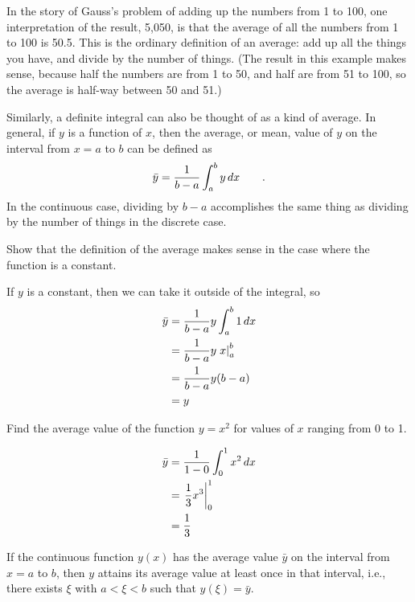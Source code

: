 In the story of Gauss's problem of adding up the numbers from 1 to 100, one interpretation of
the result, 5,050, is that the average of all the numbers from 1 to 100 is 50.5. This is the
ordinary definition of an average: add up all the things you have, and divide by the number
of things. (The result in this example makes sense, because half the numbers
are from 1 to 50, and half are from 51 to 100, so the average is half-way between 50 and 51.)

Similarly, a definite integral can also be thought of as a kind of average. In general, if $y$ is
a function of $x$, then the average, or mean, value of $y$ on the interval from $x=a$ to $b$ can be
defined as
\begin{equation*}
  \bar{y} = \frac{1}{b-a} \int_a^b y\mathop{d\!} x \qquad .
\end{equation*}
In the continuous case, dividing by $b-a$ accomplishes the same thing as dividing by the
number of things in the discrete case.

\begin{eg}
\egquestion Show that the definition of the average makes sense in the case where the function
is a constant.

\eganswer If $y$ is a constant, then we can take it outside of the integral, so
\begin{align*}
  \bar{y} &= \frac{1}{b-a} y \int_a^b 1\mathop{d\!} x \\
                     &= \frac{1}{b-a} y \left.x\right|_a^b \\
                     &= \frac{1}{b-a} y (b-a) \\
                     &= y
\end{align*}
\end{eg}

\begin{eg}\label{eg:mean-of-square}
\egquestion Find the average value of the function $y=x^2$ for values of $x$ ranging from
0 to 1.

\begin{align*}
  \bar{y} &= \frac{1}{1-0} \int_0^1 x^2\mathop{d\!} x \\
                     &= \left.\frac{1}{3}x^3\right|_0^1 \\
                     &= \frac{1}{3}
\end{align*}
\end{eg}

\begin{important}\label{mean-value-theorem-stated}
If the continuous function $y(x)$ has the average value $\bar{y}$ on the interval
from $x=a$ to $b$, then $y$ attains its average value at least once in that interval,
i.e., there exists $\xi$ with $a<\xi<b$ such that $y(\xi)=\bar{y}$.
\end{important}

